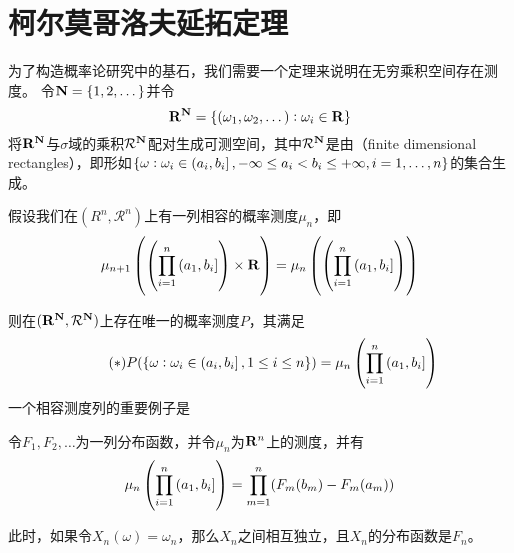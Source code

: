 \documentclass[main.tex]{subfiles}
\begin{document}
\section{柯尔莫哥洛夫延拓定理} \label{sec:a.3}
为了构造概率论研究中的基石，我们需要一个定理来说明在无穷乘积空间存在测度。
令\(\mathbf{N} = \{1,2,\dots\}\)并令
\[\mathbf{R}^{\mathbf{N}} = \{(\omega_1, \omega_2, \dots): \omega_i \in \mathbf{R}\}\]
将\(\mathbf{R}^{\mathbf{N}}\)与\(\sigma\)域的乘积\(\mathcal{R}^{\mathbf{N}}\)配对生成可测空间，其中\(\mathcal{R}^{\mathbf{N}}\)是由（finite dimensional rectangles），即形如\(\{\omega:\omega_i \in \intoc{a_i,b_i}, -\infty \leq a_i < b_i \leq +\infty, i=1,\dots,n \}\)的集合生成。
\begin{theorem}\label{thm:a.3.1}
	假设我们在\((R^n, \mathcal{R}^n)\)上有一列相容的概率测度\(\mu_n\)，即
	\[\mu_{n+1}\del{\del{\prod_{i=1}^n\intoc{a_1,b_i}}\times \R} = \mu_n\del{\del{\prod_{i=1}^n\intoc{a_1,b_i}}}\]
\end{theorem}
则在\((\mathbf{R}^{\mathbf{N}}, \mathcal{R}^{\mathbf{N}})\)上存在唯一的概率测度\(P\)，其满足
\[\label{thm:a.3.1.eq}\tag{\(*\)} P(\{\omega: \omega_i \in \intoc{a_i,b_i}, 1\leq i\leq n\}) = \mu_n\del{\prod_{i=1}^n\intoc{a_1,b_i}}\]
一个相容测度列的重要例子是
\begin{example}
	令\(F_1, F_2, \dots\)为一列分布函数，并令\(\mu_n\)为\(\mathbf{R}^n\)上的测度，并有
	\[\mu_n\del{\prod_{i=1}^n\intoc{a_1,b_i}} = \prod_{m=1}^n(F_m(b_m) - F_m(a_m))\]
\end{example}
此时，如果令\(X_n(\omega) = \omega_n\)，那么\(X_n\)之间相互独立，且\(X_n\)的分布函数是\(F_n\)。
\end{document}
